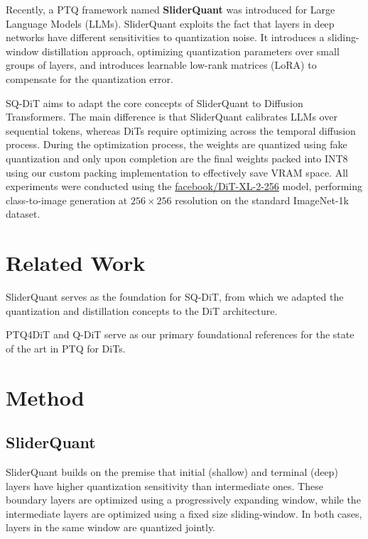 \documentclass{article}
\begin{document}
Recently, a PTQ framework named \textbf{SliderQuant} was introduced for Large Language Models (LLMs).
SliderQuant exploits the fact that layers in deep networks have different sensitivities to quantization noise. It introduces a sliding-window distillation approach, optimizing quantization parameters over small groups of layers, and introduces learnable low-rank matrices (LoRA) to compensate for the quantization error.

SQ-DiT aims to adapt the core concepts of SliderQuant to Diffusion Transformers.
The main difference is that SliderQuant calibrates LLMs over sequential tokens, whereas DiTs require optimizing across the temporal diffusion process.
During the optimization process, the weights are quantized using fake quantization and only upon completion are the final weights packed into INT8 using our custom packing implementation to effectively save VRAM space.
All experiments were conducted using the \href{https://huggingface.co/facebook/DiT-XL-2-256}{facebook/DiT-XL-2-256} model, performing class-to-image generation at $256 \times 256$ resolution on the standard ImageNet-1k dataset.


\section{Related Work}\label{sec:related}

SliderQuant \cite{wang2026sliderquantaccurateposttrainingquantization} serves as the foundation for SQ-DiT, from which we adapted the quantization and distillation concepts to the DiT architecture.

PTQ4DiT \cite{wu2024ptq4ditposttrainingquantizationdiffusion} and Q-DiT \cite{chen2024qditaccurateposttrainingquantization} serve as our primary foundational references for the state of the art in PTQ for DiTs.


\section{Method}\label{sec:quant}

\subsection{SliderQuant}

SliderQuant builds on the premise that initial (shallow) and terminal (deep) layers have higher quantization sensitivity than intermediate ones.
These boundary layers are optimized using a progressively expanding window, while the intermediate layers are optimized using a fixed size sliding-window.
In both cases, layers in the same window are quantized jointly.
\end{document}
